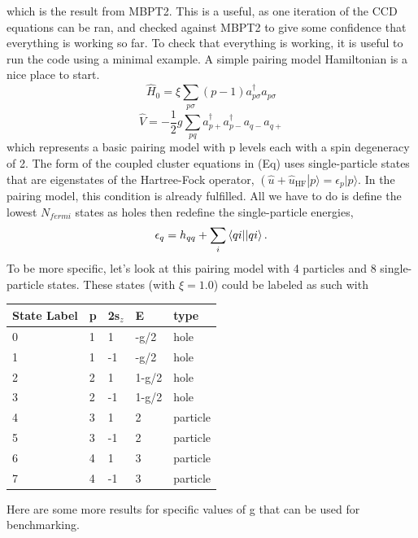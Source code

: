 which is the result from MBPT2. This is a useful, as one iteration of the CCD equations can be ran, and checked against MBPT2 to give some confidence that everything is working so far. To check that everything is working, it is useful to run the code using a minimal example. A simple pairing model Hamiltonian is a nice place to start.
\begin{equation}
\hat{H}_0 = \xi \sum_{p \sigma} (p-1) a^{\dagger}_{p \sigma} a_{p \sigma} 
\end{equation}
\begin{equation}
\hat{V} = -\frac{1}{2}g \sum_{pq} a^{\dagger}_{p+}a^{\dagger}_{p-} a_{q-}a_{q+}
\end{equation}
which represents a basic pairing model with p levels each with a spin degeneracy of 2. The form of the coupled cluster equations in (Eq) uses single-particle states that are eigenstates of the Hartree-Fock operator, $\left(\hat{u}+\hat{u}_{\text{HF}}\right\vert p\rangle=\epsilon_{p}\vert p\rangle$. In the pairing model, this condition is already fulfilled. All we have to do is define the lowest $N_{fermi}$ states as holes then redefine the single-particle energies,
\begin{equation}
\epsilon_q = h_{qq} + \sum_{i} \braket{qi||qi}.
\end{equation}
To be more specific, let's look at this pairing model with 4 particles and 8 single-particle states. These states (with $\xi = 1.0$) could be labeled as such with
\begin{center}
    \begin{tabular}{| l | l | l | l | l |}
    \hline
    State Label & p & 2s$_z$ & E & type\\ \hline
    0 & 1 & 1 & -g/2 & hole \\ \hline
    1 & 1 & -1 & -g/2 & hole \\ \hline
    2 & 2 & 1 & 1-g/2 & hole \\ \hline
    3 & 2 & -1 & 1-g/2 & hole \\ \hline
    4 & 3 & 1 & 2 & particle \\ \hline
    5 & 3 & -1 & 2 & particle \\ \hline
    6 & 4 & 1 & 3 & particle \\ \hline
    7 & 4 & -1 & 3 & particle \\ \hline 
    \end{tabular}
\end{center}

Here are some more results for specific values of g that can be used for benchmarking.

